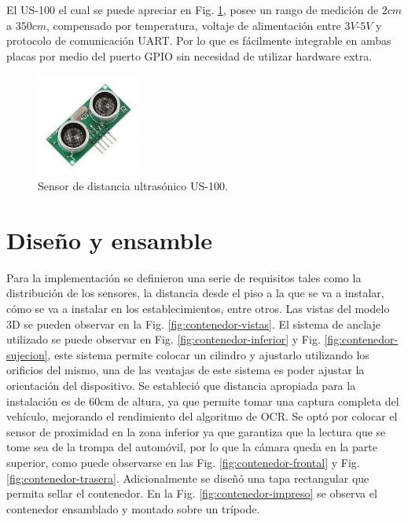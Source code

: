 El US-100 el cual se puede apreciar en Fig. \ref{fig:sensor-US100}, posee un rango de medición de $2cm$ a $350cm$, compensado por temperatura, voltaje de alimentación entre $3V$-$5V$ y protocolo de comunicación UART.
Por lo que es fácilmente integrable en ambas placas por medio del puerto GPIO sin necesidad de utilizar hardware extra.
\begin{figure}[bth]
    \centering
    \includegraphics[width=0.3\textwidth]{imgs/us-100.jpg}
    \caption{Sensor de distancia ultrasónico US-100.}
    \label{fig:sensor-US100}
\end{figure}

\section{Diseño y ensamble}

Para la implementación se definieron una serie de requisitos tales como la distribución de los sensores, la distancia desde el piso a la que se va a instalar, cómo se va a instalar en los establecimientos, entre otros. Las vistas del modelo 3D se pueden observar en la Fig. \ref{fig:contenedor-vistas}.
El sistema de anclaje utilizado se puede observar en Fig. \ref{fig:contenedor-inferior} y Fig. \ref{fig:contenedor-sujecion}, este sistema permite colocar un cilindro y ajustarlo utilizando los orificios del mismo, una de las ventajas de este sistema es poder ajustar la orientación del dispositivo.
Se estableció que distancia apropiada para la instalación es de 60cm de altura, ya que permite tomar una captura completa del vehículo, mejorando el rendimiento del algoritmo de OCR.
Se optó por colocar el sensor de proximidad en la zona inferior ya que garantiza que la lectura que se tome sea de la trompa del automóvil, por lo que la cámara queda en la parte superior, como puede observarse en las Fig. \ref{fig:contenedor-frontal} y Fig. \ref{fig:contenedor-trasera}.
Adicionalmente se diseñó una tapa rectangular que permita sellar el contenedor. En la Fig. \ref{fig:contenedor-impreso} se observa el contenedor ensamblado y montado sobre un trípode.


